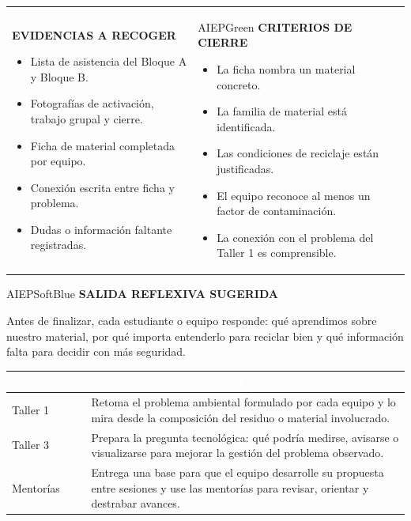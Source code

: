 ﻿\documentclass[10pt,a4paper]{article}
\newcommand{\labeltext}[1]{%
  {\scriptsize\bfseries\color{AIEPSlate}\MakeUppercase{#1}}\par\vspace{1.3mm}
}
\begin{document}
\begin{tabularx}{\textwidth}{Y Y}
\begin{card}
\labeltext{Evidencias a recoger}
\begin{itemize}
  \item Lista de asistencia del Bloque A y Bloque B.
  \item Fotografías de activación, trabajo grupal y cierre.
  \item Ficha de material completada por equipo.
  \item Conexión escrita entre ficha y problema.
  \item Dudas o información faltante registradas.
\end{itemize}
\end{card}
&
\begin{softcard}[height=43mm,valign=top]{AIEPGreen}
\labeltext{Criterios de cierre}
\begin{itemize}
  \item La ficha nombra un material concreto.
  \item La familia de material está identificada.
  \item Las condiciones de reciclaje están justificadas.
  \item El equipo reconoce al menos un factor de contaminación.
  \item La conexión con el problema del Taller 1 es comprensible.
\end{itemize}
\end{softcard}
\end{tabularx}

\vspace{4mm}
\begin{softcard}{AIEPSoftBlue}
\labeltext{Salida reflexiva sugerida}
Antes de finalizar, cada estudiante o equipo responde: qué aprendimos sobre nuestro material, por qué importa entenderlo para reciclar bien y qué información falta para decidir con más seguridad.
\end{softcard}

\vspace{4mm}
\begin{tabularx}{\textwidth}{L{27mm}Y}
\textcolor{White}{\bfseries Continuidad} & \textcolor{White}{\bfseries Cómo se conecta este taller con la secuencia GeoGreen} \\
\hline
Taller 1 & Retoma el problema ambiental formulado por cada equipo y lo mira desde la composición del residuo o material involucrado. \\
\hline
Taller 3 & Prepara la pregunta tecnológica: qué podría medirse, avisarse o visualizarse para mejorar la gestión del problema observado. \\
\hline
Mentorías & Entrega una base para que el equipo desarrolle su propuesta entre sesiones y use las mentorías para revisar, orientar y destrabar avances. \\
\hline
\end{tabularx}
\end{document}
